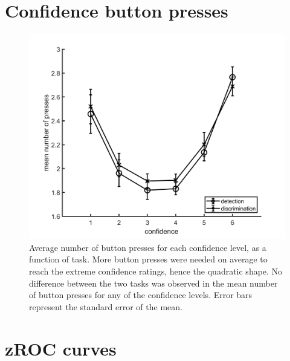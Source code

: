 \documentclass[12pt,twoside]{reedthesis}
\begin{document}
\hypertarget{app3:buttonpresses}{%
\section{Confidence button presses}\label{app3:buttonpresses}}
\begin{figure}
\includegraphics[width=\linewidth]{figure/ch3/buttonPresses} \caption[Button presses, imaging experiment]{Average number of button presses for each confidence level, as a function of task. More button presses were needed on average to reach the extreme confidence ratings, hence the quadratic shape. No difference between the two tasks was observed in the mean number of button presses for any of the confidence levels. Error bars represent the standard error of the mean.}\label{fig:buttonpresses}
\end{figure}
\hypertarget{app3:zROC}{%
\section{zROC curves}\label{app3:zROC}}
\end{document}
